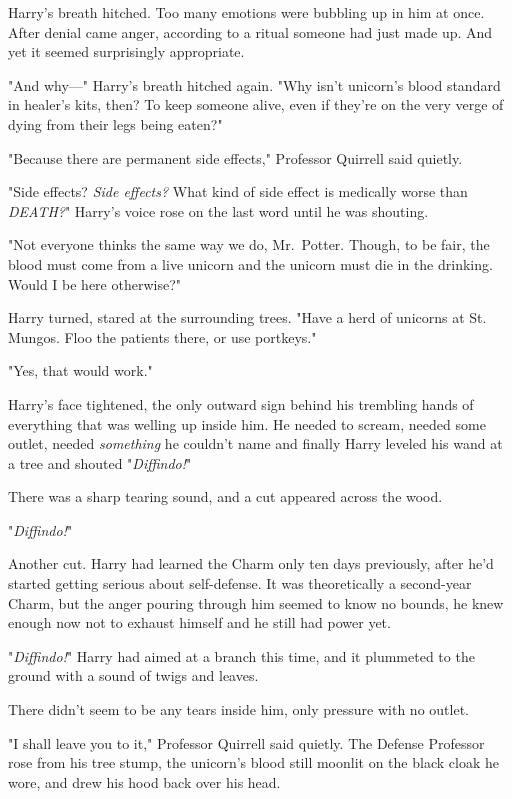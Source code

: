 Harry's breath hitched. Too many emotions were bubbling up in him at once. 
After denial came anger, according to a ritual someone had just made up. And 
yet it seemed surprisingly appropriate.

"And why---" Harry's breath hitched again. "Why isn't unicorn's blood standard 
in healer's kits, then? To keep someone alive, even if they're on the very 
verge of dying from their legs being eaten?"

"Because there are permanent side effects," Professor Quirrell said quietly.

"Side effects? \emph{Side effects?} What kind of side effect is medically worse 
than \emph{DEATH?}" Harry's voice rose on the last word until he was shouting.

"Not everyone thinks the same way we do, Mr.~Potter. Though, to be fair, the 
blood must come from a live unicorn and the unicorn must die in the drinking. 
Would I be here otherwise?"

Harry turned, stared at the surrounding trees. "Have a herd of unicorns at St. 
Mungos. Floo the patients there, or use portkeys."

"Yes, that would work."

Harry's face tightened, the only outward sign behind his trembling hands of 
everything that was welling up inside him. He needed to scream, needed some 
outlet, needed \emph{something} he couldn't name and finally Harry leveled his 
wand at a tree and shouted "\emph{Diffindo!}"

There was a sharp tearing sound, and a cut appeared across the wood.

"\emph{Diffindo!}"

Another cut. Harry had learned the Charm only ten days previously, after he'd 
started getting serious about self-defense. It was theoretically a second-year 
Charm, but the anger pouring through him seemed to know no bounds, he knew 
enough now not to exhaust himself and he still had power yet.

"\emph{Diffindo!}" Harry had aimed at a branch this time, and it plummeted to 
the ground with a sound of twigs and leaves.

There didn't seem to be any tears inside him, only pressure with no outlet.

"I shall leave you to it," Professor Quirrell said quietly. The Defense 
Professor rose from his tree stump, the unicorn's blood still moonlit on the 
black cloak he wore, and drew his hood back over his head.